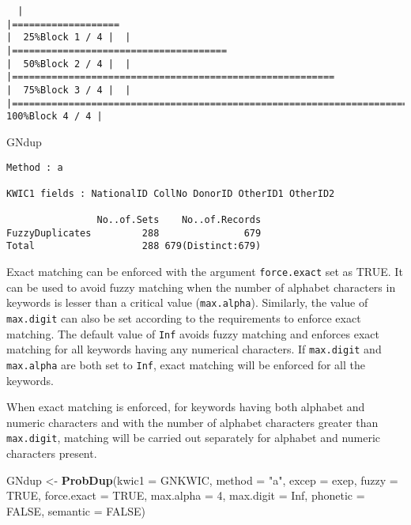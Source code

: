 \documentclass[
]{article}
\newenvironment{Shaded}{\begin{snugshade}}{\end{snugshade}}
\newcommand{\DataTypeTok}[1]{\textcolor[rgb]{0.13,0.29,0.53}{#1}}
\newcommand{\DecValTok}[1]{\textcolor[rgb]{0.00,0.00,0.81}{#1}}
\newcommand{\KeywordTok}[1]{\textcolor[rgb]{0.13,0.29,0.53}{\textbf{#1}}}
\newcommand{\NormalTok}[1]{#1}
\newcommand{\OtherTok}[1]{\textcolor[rgb]{0.56,0.35,0.01}{#1}}
\newcommand{\StringTok}[1]{\textcolor[rgb]{0.31,0.60,0.02}{#1}}
\begin{document}
\begin{verbatim}
  |                                                                                    |===================                                                         |  25%Block 1 / 4 |  |                                                                                    |======================================                                      |  50%Block 2 / 4 |  |                                                                                    |=========================================================                   |  75%Block 3 / 4 |  |                                                                                    |============================================================================| 100%Block 4 / 4 |
\end{verbatim}

\begin{Shaded}
\begin{Highlighting}[]
\NormalTok{GNdup}
\end{Highlighting}
\end{Shaded}

\begin{verbatim}
Method : a

KWIC1 fields : NationalID CollNo DonorID OtherID1 OtherID2
 
                No..of.Sets    No..of.Records
FuzzyDuplicates         288               679
Total                   288 679(Distinct:679)
\end{verbatim}

Exact matching can be enforced with the argument \texttt{force.exact}
set as TRUE. It can be used to avoid fuzzy matching when the number of
alphabet characters in keywords is lesser than a critical value
(\texttt{max.alpha}). Similarly, the value of \texttt{max.digit} can
also be set according to the requirements to enforce exact matching. The
default value of \texttt{Inf} avoids fuzzy matching and enforces exact
matching for all keywords having any numerical characters. If
\texttt{max.digit} and \texttt{max.alpha} are both set to \texttt{Inf},
exact matching will be enforced for all the keywords.

When exact matching is enforced, for keywords having both alphabet and
numeric characters and with the number of alphabet characters greater
than \texttt{max.digit}, matching will be carried out separately for
alphabet and numeric characters present.

\begin{Shaded}
\begin{Highlighting}[]
\NormalTok{GNdup <-}\StringTok{ }\KeywordTok{ProbDup}\NormalTok{(}\DataTypeTok{kwic1 =}\NormalTok{ GNKWIC, }\DataTypeTok{method =} \StringTok{"a"}\NormalTok{, }\DataTypeTok{excep =}\NormalTok{ exep, }
                 \DataTypeTok{fuzzy =} \OtherTok{TRUE}\NormalTok{, }\DataTypeTok{force.exact =} \OtherTok{TRUE}\NormalTok{, }\DataTypeTok{max.alpha =} \DecValTok{4}\NormalTok{, }\DataTypeTok{max.digit =} \OtherTok{Inf}\NormalTok{,}
                 \DataTypeTok{phonetic =} \OtherTok{FALSE}\NormalTok{, }\DataTypeTok{semantic =} \OtherTok{FALSE}\NormalTok{)}
\end{Highlighting}
\end{Shaded}
\end{document}
